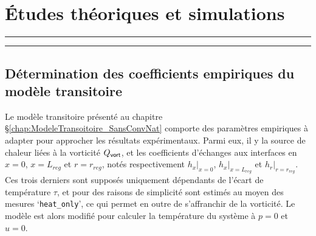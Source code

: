 \chapter{\'Etudes théoriques et simulations}
\vfill
\hrule \vspace{.5cm}
{\hypersetup{linkcolor = black}
\localtableofcontents
}%
\vspace{.5cm} \hrule
\vfill
\clearpage

\section{Détermination des coefficients empiriques du modèle transitoire}

Le modèle transitoire présenté au chapitre §\ref{chap:ModeleTransoitoire_SansConvNat} comporte des paramètres empiriques à adapter pour approcher les résultats expérimentaux. Parmi eux, il y la source de chaleur liées à la vorticité $Q_{\sf vort}$, et les coefficients d'échanges aux interfaces en $x=0$, $x=L_{reg}$ et $r=r_{reg}$, notés respectivement $h_{x}|_{x=0}$, $h_{x}|_{x=L_{reg}}$ et $h_{r}|_{r=r_{reg}}$. Ces trois derniers sont supposés uniquement dépendants de l'écart de température $\tau$, et pour des raisons de simplicité sont estimés au moyen des mesures `\texttt{heat\_only}', ce qui permet en outre de s'affranchir de la vorticité. Le modèle est alors modifié pour calculer la température du système à $p=0$ et $u=0$.